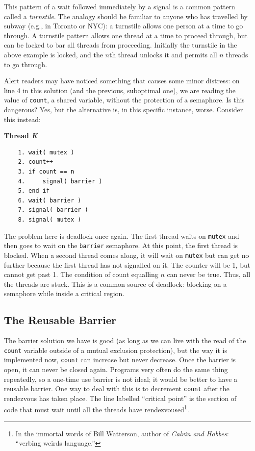 This pattern of a wait followed immediately by a signal is a common pattern called a \textit{turnstile}. The analogy should be familiar to anyone who has travelled by subway (e.g., in Toronto or NYC): a turnstile allows one person at a time to go through. A turnstile pattern allows one thread at a time to proceed through, but can be locked to bar all threads from proceeding. Initially the turnstile in the above example is locked, and the $n$th thread unlocks it and permits all $n$ threads to go through.

Alert readers may have noticed something that causes some minor distress: on line 4 in this solution (and the previous, suboptimal one), we are reading the value of \texttt{count}, a shared variable, without the protection of a semaphore. Is this dangerous? Yes, but the alternative is, in this specific instance, worse. Consider this instead:

\textbf{Thread \textit{K}}\vspace{-2em}
  \begin{verbatim}
	1. wait( mutex )
	2. count++
	3. if count == n
	4.     signal( barrier )
	5. end if
	6. wait( barrier )
	7. signal( barrier )
	8. signal( mutex )
  \end{verbatim}
\vspace{-2em}

The problem here is deadlock once again. The first thread waits on \texttt{mutex} and then goes to wait on the \texttt{barrier} semaphore. At this point, the first thread is blocked. When a second thread comes along, it will wait on \texttt{mutex} but can get no further because the first thread has not signalled on it. The counter will be 1, but cannot get past 1. The condition of count equalling $n$ can never be true. Thus, all the threads are stuck. This is a common source of deadlock: blocking on a semaphore while inside a critical region.

\subsection*{The Reusable Barrier}
The barrier solution we have is good (as long as we can live with the read of the \texttt{count} variable outside of a mutual exclusion protection), but the way it is implemented now, \texttt{count} can increase but never decrease. Once the barrier is open, it can never be closed again. Programs very often do the same thing repeatedly, so a one-time use barrier is not ideal; it would be better to have a reusable barrier. One way to deal with this is to decrement \texttt{count} after the rendezvous has taken place. The line labelled ``critical point'' is the section of code that must wait until all the threads have rendezvoused\footnote{In the immortal words of Bill Watterson, author of \textit{Calvin and Hobbes}: ``verbing weirds language.''}.


